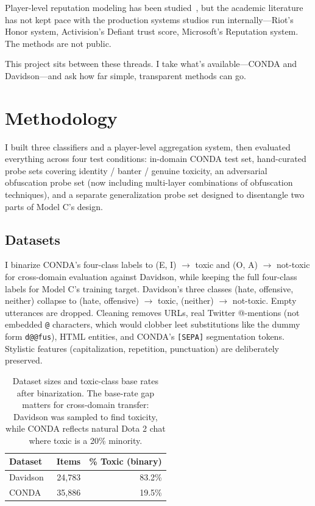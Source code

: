 \documentclass[11pt,twocolumn,letterpaper]{article}
\begin{document}
Player-level reputation modeling has been studied~\cite{kwak2015}, but the academic literature has not kept pace with the production systems studios run internally---Riot's Honor system, Activision's Defiant trust score, Microsoft's Reputation system. The methods are not public.

This project sits between these threads. I take what's available---CONDA and Davidson---and ask how far simple, transparent methods can go.

\section{Methodology}

I built three classifiers and a player-level aggregation system, then evaluated everything across four test conditions: in-domain CONDA test set, hand-curated probe sets covering identity / banter / genuine toxicity, an adversarial obfuscation probe set (now including multi-layer combinations of obfuscation techniques), and a separate generalization probe set designed to disentangle two parts of Model C's design.

\subsection{Datasets}

I binarize CONDA's four-class labels to (E, I) $\to$ toxic and (O, A) $\to$ not-toxic for cross-domain evaluation against Davidson, while keeping the full four-class labels for Model C's training target. Davidson's three classes (hate, offensive, neither) collapse to (hate, offensive) $\to$ toxic, (neither) $\to$ not-toxic. Empty utterances are dropped. Cleaning removes URLs, real Twitter @-mentions (not embedded \texttt{@} characters, which would clobber leet substitutions like the dummy form \texttt{d@@fus}), HTML entities, and CONDA's \texttt{[SEPA]} segmentation tokens. Stylistic features (capitalization, repetition, punctuation) are deliberately preserved.

\begin{table}[t]
\centering
\small
\begin{tabular}{lrr}
\toprule
Dataset & Items & \% Toxic (binary) \\
\midrule
Davidson~\cite{davidson2017} & 24{,}783 & 83.2\% \\
CONDA~\cite{weld2021}        & 35{,}886 & 19.5\% \\
\bottomrule
\end{tabular}
\caption{Dataset sizes and toxic-class base rates after binarization. The base-rate gap matters for cross-domain transfer: Davidson was sampled to find toxicity, while CONDA reflects natural Dota 2 chat where toxic is a 20\% minority.}
\end{table}
\end{document}
